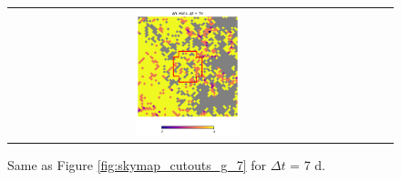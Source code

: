 \documentclass[preprintm,linenumbers]{aastex631}
\begin{document}
\begin{figure}
\begin{tabular}{  c c c}
				\includegraphics[width=0.3\textwidth]{results/skymaps_cutout/skymaps_cutout_delta_first_year_one_snap_v4_0_10yrs_db_noDD_noTwi_tscale-7_nside-256_doAllTemplateMetrics_reduceCount_g_GP_noDD_noTwi.pdf} \\
			\end{tabular}
			\caption{
   Same as Figure \ref{fig:skymap_cutouts_g_7} for $\Delta t$ = 7 d. 
    }
	\label{fig:_skymap_cutouts_g_7}
		\end{figure}
\end{document}
